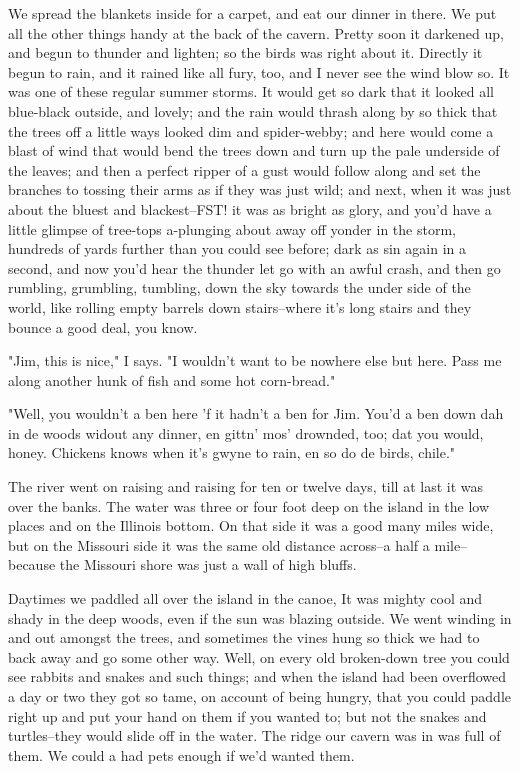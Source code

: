 We spread the blankets inside for a carpet, and eat our dinner in there.
We put all the other things handy at the back of the cavern.  Pretty soon
it darkened up, and begun to thunder and lighten; so the birds was right
about it.  Directly it begun to rain, and it rained like all fury, too,
and I never see the wind blow so.  It was one of these regular summer
storms.  It would get so dark that it looked all blue-black outside, and
lovely; and the rain would thrash along by so thick that the trees off a
little ways looked dim and spider-webby; and here would come a blast of
wind that would bend the trees down and turn up the pale underside of the
leaves; and then a perfect ripper of a gust would follow along and set
the branches to tossing their arms as if they was just wild; and next,
when it was just about the bluest and blackest--FST! it was as bright as
glory, and you'd have a little glimpse of tree-tops a-plunging about away
off yonder in the storm, hundreds of yards further than you could see
before; dark as sin again in a second, and now you'd hear the thunder let
go with an awful crash, and then go rumbling, grumbling, tumbling, down
the sky towards the under side of the world, like rolling empty barrels
down stairs--where it's long stairs and they bounce a good deal, you
know.

"Jim, this is nice," I says.  "I wouldn't want to be nowhere else but
here. Pass me along another hunk of fish and some hot corn-bread."

"Well, you wouldn't a ben here 'f it hadn't a ben for Jim.  You'd a ben
down dah in de woods widout any dinner, en gittn' mos' drownded, too; dat
you would, honey.  Chickens knows when it's gwyne to rain, en so do de
birds, chile."

The river went on raising and raising for ten or twelve days, till at
last it was over the banks.  The water was three or four foot deep on the
island in the low places and on the Illinois bottom.  On that side it was
a good many miles wide, but on the Missouri side it was the same old
distance across--a half a mile--because the Missouri shore was just a
wall of high bluffs.

Daytimes we paddled all over the island in the canoe, It was mighty cool
and shady in the deep woods, even if the sun was blazing outside.  We
went winding in and out amongst the trees, and sometimes the vines hung
so thick we had to back away and go some other way.  Well, on every old
broken-down tree you could see rabbits and snakes and such things; and
when the island had been overflowed a day or two they got so tame, on
account of being hungry, that you could paddle right up and put your hand
on them if you wanted to; but not the snakes and turtles--they would
slide off in the water.  The ridge our cavern was in was full of them.
We could a had pets enough if we'd wanted them.

